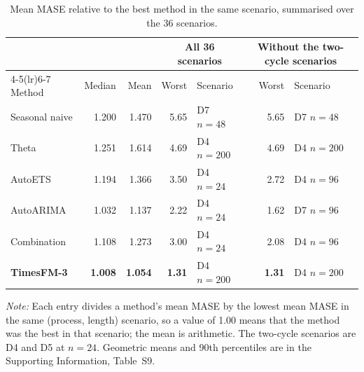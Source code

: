 \begin{table}[!htbp]
\centering
\begin{threeparttable}
\caption{Mean MASE relative to the best method in the same scenario, summarised over the 36 scenarios.}
\label{tab:robust}
\small\setlength{\tabcolsep}{4pt}
\begin{tabular}{lrrrlrl}
\toprule
 & & & \multicolumn{2}{c}{All 36 scenarios} & \multicolumn{2}{c}{Without the two-cycle scenarios} \\
\cmidrule(lr){4-5}\cmidrule(lr){6-7}
Method & Median & Mean & Worst & Scenario & Worst & Scenario \\
\midrule
Seasonal naive & 1.200 & 1.470 & 5.65 & D7 $n=48$ & 5.65 & D7 $n=48$ \\
Theta & 1.251 & 1.614 & 4.69 & D4 $n=200$ & 4.69 & D4 $n=200$ \\
AutoETS & 1.194 & 1.366 & 3.50 & D4 $n=24$ & 2.72 & D4 $n=96$ \\
AutoARIMA & 1.032 & 1.137 & 2.22 & D4 $n=24$ & 1.62 & D7 $n=96$ \\
Combination & 1.108 & 1.273 & 3.00 & D4 $n=24$ & 2.08 & D4 $n=96$ \\
\textbf{TimesFM-3} & \textbf{1.008} & \textbf{1.054} & \textbf{1.31} & D4 $n=200$ & \textbf{1.31} & D4 $n=200$ \\
\bottomrule
\end{tabular}
\begin{tablenotes}[flushleft]\footnotesize
\item \textit{Note:} Each entry divides a method's mean MASE by the lowest mean MASE in the same (process,
length) scenario, so a value of 1.00 means that the method was the best in that scenario; the mean is arithmetic.
The two-cycle scenarios are D4 and D5 at $n = 24$. Geometric means and 90th percentiles are in the Supporting
Information, Table~S9.
\end{tablenotes}
\end{threeparttable}
\end{table}
